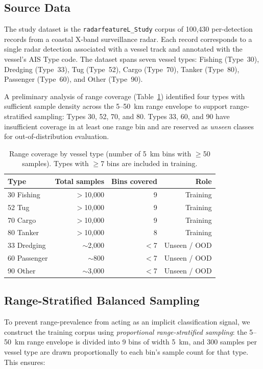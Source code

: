 \documentclass[journal]{IEEEtran}
\begin{document}
\subsection{Source Data}

The study dataset is the \texttt{radarfeatureL\_Study} corpus of
100,430 per-detection records from a coastal X-band surveillance radar.
Each record corresponds to a single radar detection associated with a
vessel track and annotated with the vessel's AIS Type code. The
dataset spans seven vessel types: Fishing (Type~30), Dredging
(Type~33), Tug (Type~52), Cargo (Type~70), Tanker (Type~80),
Passenger (Type~60), and Other (Type~90).

A preliminary analysis of range coverage (Table~\ref{tab:range_coverage})
identified four types with sufficient sample density across the
5--50~km range envelope to support range-stratified sampling: Types
30, 52, 70, and 80. Types 33, 60, and 90 have insufficient coverage
in at least one range bin and are reserved as \emph{unseen} classes
for out-of-distribution evaluation.

\begin{table}[H]
\centering
\caption{Range coverage by vessel type (number of 5~km bins with $\geq$50
         samples). Types with $\geq$7 bins are included in training.}
\label{tab:range_coverage}
\begin{tabular}{lrrr}
\toprule
\textbf{Type} & \textbf{Total samples} & \textbf{Bins covered} & \textbf{Role} \\
\midrule
30 Fishing  & $>$10,000 & 9  & Training \\
52 Tug      & $>$10,000 & 9  & Training \\
70 Cargo    & $>$10,000 & 9  & Training \\
80 Tanker   & $>$10,000 & 8  & Training \\
33 Dredging & $\sim$2,000 & $<$7 & Unseen / OOD \\
60 Passenger& $\sim$800   & $<$7 & Unseen / OOD \\
90 Other    & $\sim$3,000 & $<$7 & Unseen / OOD \\
\bottomrule
\end{tabular}
\end{table}

\subsection{Range-Stratified Balanced Sampling}
\label{sec:stratified}

To prevent range-prevalence from acting as an implicit classification
signal, we construct the training corpus using \emph{proportional
range-stratified sampling}: the 5--50~km range envelope is divided into
9 bins of width 5~km, and 300 samples per vessel type are drawn
proportionally to each bin's sample count for that type. This ensures:
\end{document}

